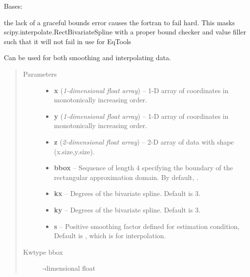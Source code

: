 \documentclass[letterpaper,10pt,english]{sphinxmanual}
\begin{document}
\begin{fulllineitems}
\label{eqtools:eqtools.trispline.RectBivariateSpline}
Bases: 

the lack of a graceful bounds error causes the fortran to fail hard.
This masks scipy.interpolate.RectBivariateSpline with a proper bound
checker and value filler such that it will not fail in use for EqTools

Can be used for both smoothing and interpolating data.
\begin{quote}\begin{description}
\item[{Parameters}] \leavevmode\begin{itemize}
\item {} 
\textbf{x} (\emph{1-dimensional float array}) -- 1-D array of coordinates in monotonically increasing order.

\item {} 
\textbf{y} (\emph{1-dimensional float array}) -- 1-D array of coordinates in monotonically increasing order.

\item {} 
\textbf{z} (\emph{2-dimensional float array}) -- 2-D array of data with shape (x.size,y.size).

\item {} 
\textbf{bbox} -- Sequence of length 4 specifying the
boundary of the rectangular approximation domain.  By default,
.

\item {} 
\textbf{kx} -- Degrees of the bivariate spline. Default is 3.

\item {} 
\textbf{ky} -- Degrees of the bivariate spline. Default is 3.

\item {} 
\textbf{s} -- Positive smoothing factor defined for estimation condition,
Default is , which is for interpolation.

\end{itemize}

\item[{Kwtype bbox}] -dimensional float


\end{description}
\end{quote}
\end{fulllineitems}
\end{document}
